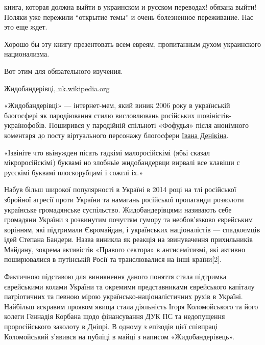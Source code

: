 \begin{itemize}

книга, которая должна выйти в украинском и русском переводах! обязана выйти!
Поляки уже пережили \enquote{открытие темы} и очень болезненное переживание. Нас это
еще ждет.

Хорошо бы эту книгу презентовать всем евреям, пропитанным духом украинского национализма.

Вот этим для обязательного изучения. 

\href{https://uk.wikipedia.org/w/index.php?title=Жидобандерівці}{%
Жидобандерівці, uk.wikipedia.org%
}

\begin{multicols}{2}

«Жидобандерівці» — інтернет-мем, який виник 2006 року в українській блогосфері
як пародіювання стилю висловлювань російських шовіністів-українофобів.
Поширився у пародійній спільноті «Фофудья» після анонімного коментаря до посту
віртуального персонажу блогосфери \href{https://uk.wikipedia.org/wiki/Іван_Денікін}{Івана Денікіна}.

«Ізвініте что вьінужден пісать гадкімі малоросійскімі (ябьі сказал
мікроросійскімі) буквамі но злобньіе жидобандервци вирвалі все клавіши с
русскімі буквамі плоскорубцамі і сожглі іх.»


Набув більш широкої популярності в Україні в 2014 році на тлі російської
збройної агресії проти України та намагань російської пропаганди розколоти
українське громадянське суспільство. Жидобандерівцями називають себе громадяни
України з розвинутим почуттям гумору та необов'язково єврейським корінням, які
підтримали Євромайдан, і українських націоналістів — спадкоємців ідей Степана
Бандери. Назва виникла як реакція на звинувачення прихильників Майдану, зокрема
активістів «Правого сектора» в антисемітизмі, які активно поширювалися в
путінській Росії та транслювалися на інші країни[2].

Фактичною підставою для виникнення даного поняття стала підтримка єврейськими
колами України та окремими представниками єврейського капіталу патріотичних та
певною мірою українсько-націоналістичних рухів в Україні. Найбільш яскравим
проявом явища стала діяльність Ігоря Коломойського та його колеги Геннадія
Корбана щодо фінансування ДУК ПС та недопущення проросійського заколоту в
Дніпрі. В одному з епізодів цієї співпраці Коломойський з'явився на публіці в
майці з написом «Жидобандерівець».



\end{multicols}
\end{itemize}

